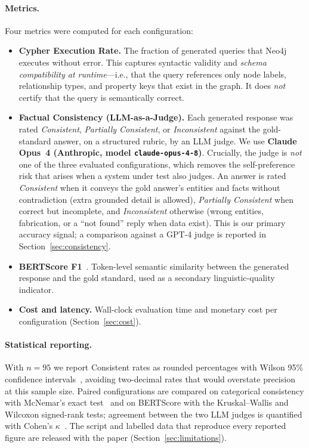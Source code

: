 \documentclass{ceurart}
\begin{document}
\paragraph{Metrics.}
Four metrics were computed for each configuration:
\begin{itemize}
  \item \textbf{Cypher Execution Rate.} The fraction of generated queries that
        Neo4j executes without error. This captures syntactic validity and
        \emph{schema compatibility at runtime}---i.e., that the query references
        only node labels, relationship types, and property keys that exist in the
        graph. It does \emph{not} certify that the query is semantically correct.
  \item \textbf{Factual Consistency (LLM-as-a-Judge).} Each generated response was
        rated \emph{Consistent}, \emph{Partially Consistent}, or \emph{Inconsistent}
        against the gold-standard answer, on a structured rubric, by an LLM judge.
        We use \textbf{Claude Opus~4 (Anthropic, model \texttt{claude-opus-4-8})}.
        Crucially, the judge is \emph{not} one of the three evaluated configurations,
        which removes the self-preference risk that arises when a system under test
        also judges. An answer is rated \emph{Consistent} when it conveys the gold
        answer's entities and facts without contradiction (extra grounded detail is
        allowed), \emph{Partially Consistent} when correct but incomplete, and
        \emph{Inconsistent} otherwise (wrong entities, fabrication, or a ``not
        found'' reply when data exist). This is our primary accuracy signal; a
        comparison against a GPT-4 judge is reported in Section~\ref{sec:consistency}.
  \item \textbf{BERTScore F1}~\cite{bert-score}. Token-level semantic similarity
        between the generated response and the gold standard, used as a secondary
        linguistic-quality indicator.
  \item \textbf{Cost and latency.} Wall-clock evaluation time and monetary cost per
        configuration (Section~\ref{sec:cost}).
\end{itemize}

\paragraph{Statistical reporting.}
With $n=95$ we report Consistent rates as rounded percentages with Wilson 95\%
confidence intervals~\cite{wilson1927}, avoiding two-decimal rates that would
overstate precision at this sample size. Paired configurations are compared on
categorical consistency with McNemar's exact test~\cite{mcnemar1947} and on
BERTScore with the Kruskal--Wallis and Wilcoxon signed-rank tests; agreement
between the two LLM judges is quantified with Cohen's $\kappa$~\cite{cohen1960}.
The script and labelled data that reproduce every reported figure are released
with the paper (Section~\ref{sec:limitations}).
\end{document}
